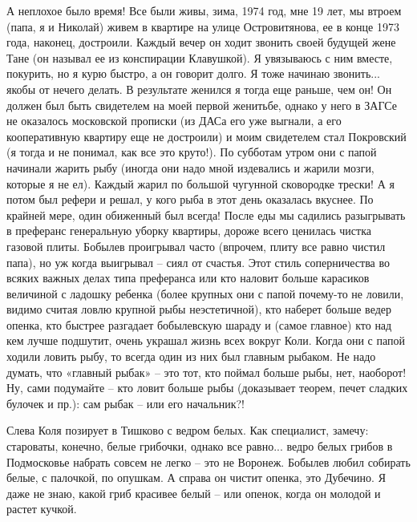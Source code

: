  А неплохое было время! Все были живы, зима, 1974 год, мне 19 лет, мы втроем (папа, я и Николай) живем в квартире на улице Островитянова, ее в конце 1973 года, наконец, достроили. Каждый вечер он ходит звонить своей будущей жене Тане (он называл ее из конспирации Клавушкой). Я увязываюсь с ним вместе, покурить, но я курю быстро, а он говорит долго. Я тоже начинаю звонить... якобы от нечего делать. В результате женился я тогда еще раньше, чем он! Он должен был быть свидетелем на моей первой женитьбе, однако у него в ЗАГСе не оказалось московской прописки (из ДАСа его уже выгнали, а его кооперативную квартиру еще не достроили) и моим свидетелем стал Покровский (я тогда и не понимал, как все это круто!). По субботам утром они с папой начинали жарить рыбу (иногда они надо мной издевались и жарили мозги, которые я не ел). Каждый жарил по большой чугунной сковородке трески! А я потом был рефери и решал, у кого рыба в этот день оказалась вкуснее. По крайней мере, один обиженный был всегда! После еды мы садились разыгрывать в преферанс генеральную уборку квартиры, дороже всего ценилась чистка газовой плиты. Бобылев проигрывал часто (впрочем, плиту все равно чистил папа), но уж когда выигрывал – сиял от счастья. Этот стиль соперничества во всяких важных делах типа преферанса или кто наловит больше карасиков величиной с ладошку ребенка (более крупных они с папой почему-то не ловили, видимо считая ловлю крупной рыбы неэстетичной), кто наберет больше ведер опенка, кто быстрее разгадает бобылевскую шараду  и (самое главное) кто над кем лучше подшутит, очень украшал жизнь всех вокруг Коли. Когда они с папой ходили ловить рыбу, то всегда один из них был главным рыбаком. Не надо думать, что «главный рыбак» – это тот, кто поймал больше рыбы, нет, наоборот! Ну, сами подумайте – кто ловит больше рыбы (доказывает теорем, печет сладких булочек и пр.): сам рыбак – или его начальник?!

 	     Слева Коля позирует в Тишково с ведром белых. Как специалист, замечу: староваты, конечно, белые грибочки, однако все равно... ведро белых грибов в Подмосковье набрать совсем не легко – это не Воронеж. Бобылев любил собирать белые, с палочкой, по опушкам. А справа он чистит опенка, это Дубечино. Я даже не знаю, какой гриб красивее белый – или опенок, когда он молодой и растет кучкой.

